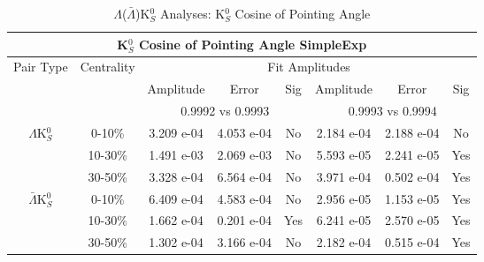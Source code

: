 \documentclass[../AnalysisNoteJBuxton.tex]{subfiles}
\begin{document}
\begin{table}
 \centering
 \begin{tabular}{|c|c|c|c|c||c|c|c|}
  \multicolumn{8}{c}{K$^{0}_{S}$ Cosine of Pointing Angle SimpleExp} \\
  \hline
  \multirow{3}{*}{Pair Type} & \multirow{3}{*}{Centrality} & \multicolumn{6}{c|}{Fit Amplitudes} \\
  \cline{3-8}
   & & Amplitude & Error & Sig & Amplitude & Error & Sig \\  
  \cline{3-8}
   & & \multicolumn{3}{c||}{0.9992 vs 0.9993} & \multicolumn{3}{c|}{0.9993 vs 0.9994} \\  
  \hline  
  \multirow{3}{*}{$\Lambda$K$^{0}_{S}$}  
   &  0-10\% & 3.209 e-04 & 4.053 e-04 & No & 2.184 e-04 & 2.188 e-04 & No \\
   & 10-30\% & 1.491 e-03 & 2.069 e-03 & No & 5.593 e-05 & 2.241 e-05 & Yes \\
   & 30-50\% & 3.328 e-04 & 6.564 e-04 & No & 3.971 e-04 & 0.502 e-04 & Yes \\
  \hline  
  \multirow{3}{*}{$\bar{\Lambda}$K$^{0}_{S}$}  
   &  0-10\% & 6.409 e-04 & 4.583 e-04 & No & 2.956 e-05 & 1.153 e-05 & Yes \\
   & 10-30\% & 1.662 e-04 & 0.201 e-04 & Yes & 6.241 e-05 & 2.570 e-05 & Yes \\
   & 30-50\% & 1.302 e-04 & 3.166 e-04 & No & 2.182 e-04 & 0.515 e-04 & Yes \\
  \hline
 \end{tabular}
 \caption{$\Lambda$($\bar{\Lambda}$)K$^{0}_{S}$ Analyses: K$^{0}_{S}$ Cosine of Pointing Angle}
 \label{tab:K0CosPointingAngleLamK0_SimpleExp}
\end{table}
\end{document}

